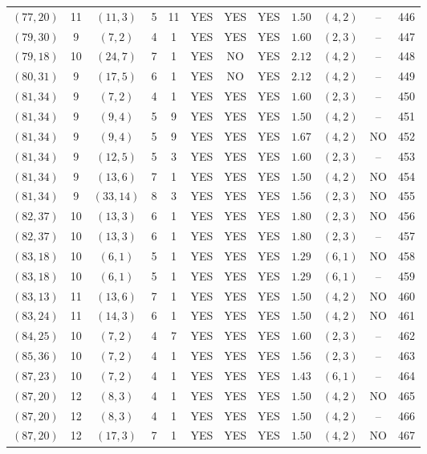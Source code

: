 \begin{longtable}{|c|c|c|c|c|c|c|c|c|c|c|c|}
$(77,20)$ & 11 & $(11,3)$ & 5 & 11 & YES & YES & YES & $1.50$ & $(4,2)$ & -- & 446\\
$(79,30)$ & 9 & $(7,2)$ & 4 & 1 & YES & YES & YES & $1.60$ & $(2,3)$ & -- & 447\\
$(79,18)$ & 10 & $(24,7)$ & 7 & 1 & YES & NO & YES & $2.12$ & $(4,2)$ & -- & 448\\
$(80,31)$ & 9 & $(17,5)$ & 6 & 1 & YES & NO & YES & $2.12$ & $(4,2)$ & -- & 449\\
$(81,34)$ & 9 & $(7,2)$ & 4 & 1 & YES & YES & YES & $1.60$ & $(2,3)$ & -- & 450\\
$(81,34)$ & 9 & $(9,4)$ & 5 & 9 & YES & YES & YES & $1.50$ & $(4,2)$ & -- & 451\\
$(81,34)$ & 9 & $(9,4)$ & 5 & 9 & YES & YES & YES & $1.67$ & $(4,2)$ & NO & 452\\
$(81,34)$ & 9 & $(12,5)$ & 5 & 3 & YES & YES & YES & $1.60$ & $(2,3)$ & -- & 453\\
$(81,34)$ & 9 & $(13,6)$ & 7 & 1 & YES & YES & YES & $1.50$ & $(4,2)$ & NO & 454\\
$(81,34)$ & 9 & $(33,14)$ & 8 & 3 & YES & YES & YES & $1.56$ & $(2,3)$ & NO & 455\\
$(82,37)$ & 10 & $(13,3)$ & 6 & 1 & YES & YES & YES & $1.80$ & $(2,3)$ & NO & 456\\
$(82,37)$ & 10 & $(13,3)$ & 6 & 1 & YES & YES & YES & $1.80$ & $(2,3)$ & -- & 457\\
$(83,18)$ & 10 & $(6,1)$ & 5 & 1 & YES & YES & YES & $1.29$ & $(6,1)$ & NO & 458\\
$(83,18)$ & 10 & $(6,1)$ & 5 & 1 & YES & YES & YES & $1.29$ & $(6,1)$ & -- & 459\\
$(83,13)$ & 11 & $(13,6)$ & 7 & 1 & YES & YES & YES & $1.50$ & $(4,2)$ & NO & 460\\
$(83,24)$ & 11 & $(14,3)$ & 6 & 1 & YES & YES & YES & $1.50$ & $(4,2)$ & NO & 461\\
$(84,25)$ & 10 & $(7,2)$ & 4 & 7 & YES & YES & YES & $1.60$ & $(2,3)$ & -- & 462\\
$(85,36)$ & 10 & $(7,2)$ & 4 & 1 & YES & YES & YES & $1.56$ & $(2,3)$ & -- & 463\\
$(87,23)$ & 10 & $(7,2)$ & 4 & 1 & YES & YES & YES & $1.43$ & $(6,1)$ & -- & 464\\
$(87,20)$ & 12 & $(8,3)$ & 4 & 1 & YES & YES & YES & $1.50$ & $(4,2)$ & NO & 465\\
$(87,20)$ & 12 & $(8,3)$ & 4 & 1 & YES & YES & YES & $1.50$ & $(4,2)$ & -- & 466\\
$(87,20)$ & 12 & $(17,3)$ & 7 & 1 & YES & YES & YES & $1.50$ & $(4,2)$ & NO & 467\\

\end{longtable}
